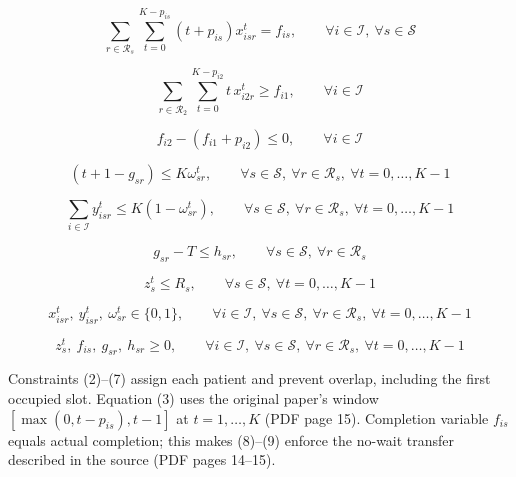 \documentclass{article}
\begin{document}
\begin{equation}
\sum_{r \in \mathcal{R}_s} \sum_{t=0}^{K-p_{is}} (t+p_{is}) x_{isr}^t = f_{is},
\qquad
\forall i \in \mathcal{I},\ \forall s \in \mathcal{S}
\tag{7}
\end{equation}

\begin{equation}
\sum_{r \in \mathcal{R}_2} \sum_{t=0}^{K-p_{i2}} t \, x_{i2r}^t \ge f_{i1},
\qquad
\forall i \in \mathcal{I}
\tag{8}
\end{equation}

\begin{equation}
f_{i2} - (f_{i1} + p_{i2}) \le 0,
\qquad
\forall i \in \mathcal{I}
\tag{9}
\end{equation}

\begin{equation}
(t+1-g_{sr}) \le K\omega_{sr}^t,
\qquad
\forall s \in \mathcal{S},\ \forall r \in \mathcal{R}_s,\ \forall t = 0,\ldots,K-1
\tag{10}
\end{equation}

\begin{equation}
\sum_{i \in \mathcal{I}} y_{isr}^t \le K(1-\omega_{sr}^t),
\qquad
\forall s \in \mathcal{S},\ \forall r \in \mathcal{R}_s,\ \forall t = 0,\ldots,K-1
\tag{11}
\end{equation}

\begin{equation}
g_{sr} - T \le h_{sr},
\qquad
\forall s \in \mathcal{S},\ \forall r \in \mathcal{R}_s
\tag{12}
\end{equation}

\begin{equation}
z_s^t \le R_s,
\qquad
\forall s \in \mathcal{S},\ \forall t = 0,\ldots,K-1
\tag{13}
\end{equation}

\begin{equation}
x_{isr}^t,\ y_{isr}^t,\ \omega_{sr}^t \in \{0,1\},
\qquad
\forall i \in \mathcal{I},\ \forall s \in \mathcal{S},\ \forall r \in \mathcal{R}_s,\ \forall t = 0,\ldots,K-1
\tag{14}
\end{equation}

\begin{equation}
z_s^t,\ f_{is},\ g_{sr},\ h_{sr} \ge 0,
\qquad
\forall i \in \mathcal{I},\ \forall s \in \mathcal{S},\ \forall r \in \mathcal{R}_s,\ \forall t = 0,\ldots,K-1
\tag{15}
\end{equation}

Constraints (2)--(7) assign each patient and prevent overlap, including
the first occupied slot. Equation (3) uses the original paper's window
$[\max(0,t-p_{is}),t-1]$ at $t=1,\ldots,K$ (PDF page 15).
Completion variable $f_{is}$ equals actual completion; this makes (8)--(9)
enforce the no-wait transfer described in the source (PDF pages 14--15).
\end{document}
